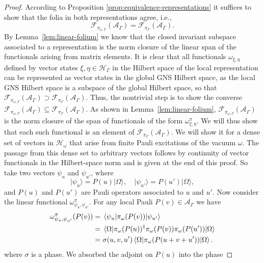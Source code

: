 \documentclass[aps,pra,reprint,superscriptaddress]{revtex4-2}
\newcommand{\cA}{{\mathcal A}}
\newcommand{\cF}{{\mathcal F}}
\newcommand{\cH}{{\mathcal H}}
\newcommand\G{\Gamma}
\newcommand\h{\eta}
\newcommand\s{\sigma}
\newcommand\w{\omega}
\newcommand\W{\Omega}
\newcommand\x{\xi}
\newcommand\y{\psi}
\providecommand{\ket}[1]{\lvert #1\rangle}
\theoremstyle{definition}
\theoremstyle{remark}
\begin{document}
\begin{proof}
    According to Proposition \ref{prop:equivalence-representations} it suffices to show that the folia in both representations agree, i.e.,  
    \begin{equation}
        \cF_{\pi_{\w,\G}}(\cA_\G) = \cF_{\pi_\G}(\cA_\G).
    \end{equation}
    By Lemma~\ref{lem:linear-folium} we know that the closed invariant subspace associated to a representation is the norm closure of the linear span of the functionals arising from matrix elements. It is clear that all functionals $\w_{\xi,\eta}$ defined by vector states $\xi,\eta \in \cH_\G$ in the Hilbert space of the local representation can be represented as vector states in the global GNS Hilbert space, as the local GNS Hilbert space is a subspace of the global Hilbert space, so that 
	    $\cF_{\pi_{\w,\G}}(\cA_\G) \supset \cF_{\pi_\G}(\cA_\G)$.
	    Thus, the nontrivial step is to show the converse $\cF_{\pi_{\w,\G}}(\cA_\G) \subseteq \cF_{\pi_\G}(\cA_\G)$.
	    As shown in Lemma~\ref{lem:linear-folium},
	    $\cF_{\pi_{\w,\G}}(\cA_\G)$ is the norm closure of the span of
	    functionals of the form $\w^{\pi}_{\x,\h}$. We
	    will thus show that each such functional is an element of
        $\cF_{\pi_\G}(\cA_\G)$. We will show it for a dense set of vectors in
        $\cH_\w$ that arise from finite Pauli excitations of the vacuum $\w$.
        The passage from this dense set to arbitrary vectors follows
        by continuity of vector functionals in the Hilbert-space norm and is
        given at the end of this proof.
        So take two vectors $\psi_u$ and
	    $\psi_{u'}$, where
	    \begin{equation}
	        \ket{\psi_u} = P(u)\ket{\W},
	        \quad
	        \ket{\psi_{u'}} = P(u')\ket{\W},
	    \end{equation}
	    and $P(u)$ and $P(u')$ are Pauli operators associated to $u$ and
	    $u'$. Now consider the linear functional $\w^{\pi}_{\y_u,\y_{u'}}$.
        For any local Pauli $P(v) \in \cA_{\G}$ we have 
        \begin{align}
            \w^{\pi}_{\y_u,\y_{u'}}(P(v))
            &=
            \mel{\y_u}{\pi_{\w}(P(v))}{\y_{u'}} \notag\\
            &=
            \mel{\W}{\pi_\w(P(u))^\dagger \pi_\w(P(v))\pi_\w(P(u'))}{\W}
            \notag\\
            &=
            \s(u,v,u')\mel{\W}{\pi_\w(P(u+v+u'))}{\W}.
        \end{align}
        where $\s$ is a phase. We absorbed the adjoint on $P(u)$ into the phase

\end{proof}
\end{document}
